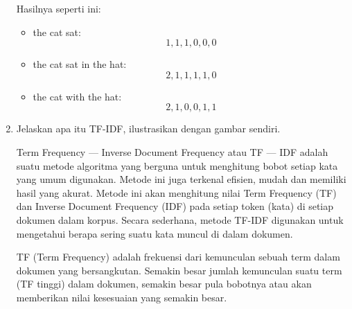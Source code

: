 \begin{enumerate}
	Hasilnya seperti ini:
	\begin{itemize}
		\item the cat sat: \[1, 1, 1, 0, 0, 0\]
		\item the cat sat in the hat: \[2, 1, 1, 1, 1, 0\]
		\item the cat with the hat: \[2, 1, 0, 0, 1, 1\]
	\end{itemize}

	\item Jelaskan apa itu TF-IDF, ilustrasikan dengan gambar sendiri.
	
	Term Frequency — Inverse Document Frequency atau TF — IDF adalah suatu metode algoritma yang berguna untuk menghitung bobot setiap kata yang umum digunakan. Metode ini juga terkenal efisien, mudah dan memiliki hasil yang akurat. Metode ini akan menghitung nilai Term Frequency (TF) dan Inverse Document Frequency (IDF) pada setiap token (kata) di setiap dokumen dalam korpus. Secara sederhana, metode TF-IDF digunakan untuk mengetahui berapa sering suatu kata muncul di dalam dokumen.
	
	TF (Term Frequency) adalah frekuensi dari kemunculan sebuah term dalam dokumen yang bersangkutan. Semakin besar jumlah kemunculan suatu term (TF tinggi) dalam dokumen, semakin besar pula bobotnya atau akan memberikan nilai kesesuaian yang semakin besar.


\end{enumerate}
